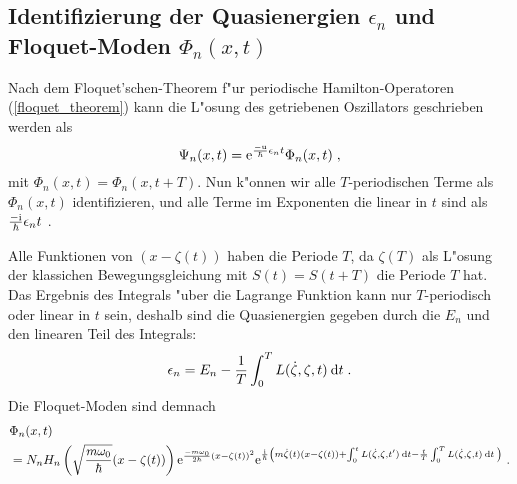     \subsection{\texorpdfstring{Identifizierung der Quasienergien $\epsilon_n$ und Floquet-Moden $\Phi_n(x,t)$}{Identifizierung der Quasienergien \epsilon_n und Floquet-Moden \Phi_n(x,t)}}
      Nach dem Floquet'schen-Theorem f"ur periodische Hamilton-Operatoren (\ref{floquet_theorem}) kann die L"osung des getriebenen Oszillators geschrieben werden als
      \begin{equation}
        \Psi_n(x,t) = \text e^{\frac{-\text u}{\hbar}\epsilon_nt}\Phi_n(x,t) \; ,
      \end{equation}
      mit $\Phi_n(x,t)=\Phi_n(x,t+T)$.
      Nun k"onnen wir alle $T$-periodischen Terme als $\Phi_n(x,t)$ identifizieren, und alle Terme im Exponenten die linear in $t$ sind als $\frac{-\text i}{\hbar}\epsilon_n t$ \cite{haenggi}.

      Alle Funktionen von $(x-\zeta(t))$ haben die Periode $T$, da $\zeta(T)$ als L"osung der klassichen Bewegungsgleichung mit $S(t)=S(t+T)$ die Periode $T$ hat.
      Das Ergebnis des Integrals "uber die Lagrange Funktion kann nur $T$-periodisch oder linear in $t$ sein, deshalb sind die Quasienergien gegeben durch die $E_n$ und den linearen Teil des Integrals:
      \begin{equation}
        \epsilon_n = E_n - \frac{1}{T} \int_0^T L(\dot \zeta, \zeta, t) \: \text d t \; .
      \end{equation}
      Die Floquet-Moden sind demnach
      \begin{align}
        \begin{split}
          &\Phi_n(x,t) \\
          &= N_nH_n\left(\sqrt{\frac{m\omega_0}{\hbar}}(x-\zeta(t))\right) \text e^{\frac{-m\omega_0}{2\hbar}(x-\zeta(t))^2} \text e^{\frac{\text i}{\hbar}\left(m\dot \zeta(t)(x-\zeta(t))+\int_0^tL(\dot \zeta,\zeta,t')\:\text d t-\frac{t}{T} \int_0^T L(\dot \zeta,\zeta,t)\:\text dt\: \right)} \; .
        \end{split}
      \end{align}


